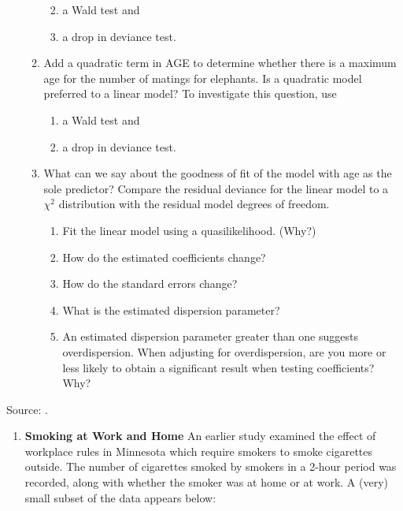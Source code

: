 \documentclass[
]{krantz}
\providecommand{\tightlist}{%
  \setlength{\itemsep}{0pt}\setlength{\parskip}{0pt}}
\begin{document}
\begin{enumerate}
\begin{enumerate}
    \begin{enumerate}
    \def\labelenumiii{\roman{enumiii}.}
    \tightlist
    \item
      a Wald test and
    \item
      a drop in deviance test.
    \end{enumerate}
  \item
    Add a quadratic term in AGE to determine whether there is a maximum age for the number of matings for elephants. Is a quadratic model preferred to a linear model? To investigate this question, use

    \begin{enumerate}
    \def\labelenumiii{\roman{enumiii}.}
    \tightlist
    \item
      a Wald test and
    \item
      a drop in deviance test.
    \end{enumerate}
  \item
    What can we say about the goodness of fit of the model with age as the sole predictor? Compare the residual deviance for the linear model to a \(\chi^2\) distribution with the residual model degrees of freedom.

    \begin{enumerate}
    \def\labelenumiii{\roman{enumiii}.}
    \tightlist
    \item
      Fit the linear model using a quasilikelihood. (Why?)
    \item
      How do the estimated coefficients change?
    \item
      How do the standard errors change?
    \item
      What is the estimated dispersion parameter?
    \item
      An estimated dispersion parameter greater than one suggests overdispersion. When adjusting for overdispersion, are you more or less likely to obtain a significant result when testing coefficients? Why?
    \end{enumerate}
  \end{enumerate}
\end{enumerate}

Source: \citep{Ramsey2002}.

\begin{enumerate}
\def\labelenumi{\arabic{enumi}.}
\setcounter{enumi}{2}
\tightlist
\item
  \textbf{Smoking at Work and Home}
  An earlier study examined the effect of workplace rules in Minnesota which require smokers to smoke cigarettes outside. The number of cigarettes smoked by smokers in a 2-hour period was recorded, along with whether the smoker was at home or at work. A (very) small subset of the data appears below:
\end{enumerate}
\end{document}
